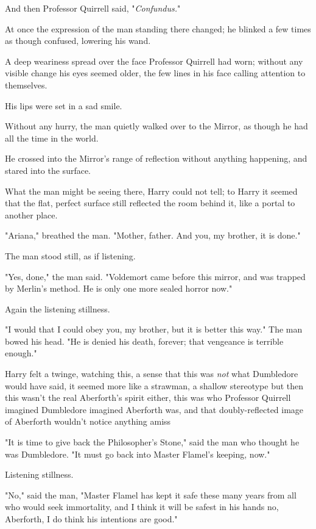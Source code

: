 And then Professor Quirrell said, "\emph{Confundus.}"

At once the expression of the man standing there changed; he blinked a few
times as though confused, lowering his wand.

A deep weariness spread over the face Professor Quirrell had worn; without any
visible change his eyes seemed older, the few lines in his face calling
attention to themselves.

His lips were set in a sad smile.

Without any hurry, the man quietly walked over to the Mirror, as though he had
all the time in the world.

He crossed into the Mirror's range of reflection without anything happening,
and stared into the surface.

What the man might be seeing there, Harry could not tell; to Harry it seemed
that the flat, perfect surface still reflected the room behind it, like a
portal to another place.

"Ariana," breathed the man. "Mother, father. And you, my brother, it is done."

The man stood still, as if listening.

"Yes, done," the man said. "Voldemort came before this mirror, and was trapped
by Merlin's method. He is only one more sealed horror now."

Again the listening stillness.

"I would that I could obey you, my brother, but it is better this way." The man
bowed his head. "He is denied his death, forever; that vengeance is terrible
enough."

Harry felt a twinge, watching this, a sense that this was \emph{not} what
Dumbledore would have said, it seemed more like a strawman, a shallow
stereotype{\el} but then this wasn't the real Aberforth's spirit either,
this was who Professor Quirrell imagined Dumbledore imagined Aberforth was, and
that doubly-reflected image of Aberforth wouldn't notice anything amiss{\el}

"It is time to give back the Philosopher's Stone," said the man who thought he
was Dumbledore. "It must go back into Master Flamel's keeping, now."

Listening stillness.

"No," said the man, "Master Flamel has kept it safe these many years from all
who would seek immortality, and I think it will be safest in his hands{\el}
no, Aberforth, I do think his intentions are good."

